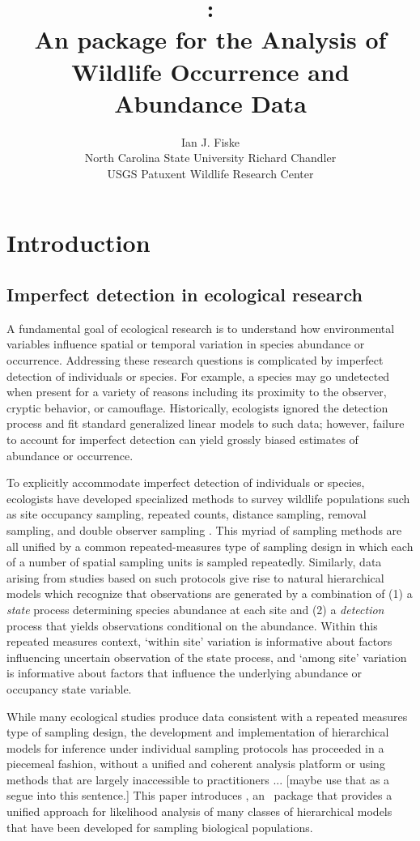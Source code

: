 \documentclass[article,shortnames]{jss}
\author{Ian J. Fiske\\North Carolina State University \And
  Richard Chandler\\ USGS Patuxent Wildlife Research Center}
\title{\pkg{unmarked}:\\
  An \proglang{R} package for the Analysis of Wildlife Occurrence and Abundance Data}
\newcommand{\um}{\pkg{unmarked}}
\newcommand{\rlang}{\proglang{R}}
\begin{document}
\section{Introduction}


\subsection{Imperfect detection in ecological research}

A fundamental goal of ecological research is to understand how environmental 
variables influence spatial or temporal variation in species abundance or 
occurrence.  Addressing these research questions is complicated by imperfect 
detection of individuals or species.  For example, a species may go 
undetected when present for a variety of reasons including its proximity to 
the observer, cryptic behavior, or camouflage.  Historically, 
ecologists ignored the detection process and fit standard generalized linear 
models to such data; however, failure to account for imperfect detection can 
yield grossly biased estimates of abundance or occurrence.  

To explicitly accommodate imperfect detection of individuals or species, 
ecologists have developed specialized methods to survey wildlife 
populations such as site occupancy sampling, repeated counts, 
distance sampling, removal sampling, and double observer sampling 
\citetext{see Section~\ref{sec:models-impl-unmark} and 
\citep{WilliamsEA2002} for definitions}.  This myriad of sampling methods 
are all unified by a common repeated-measures type of sampling design in 
which each of a number of spatial sampling units is sampled repeatedly.  
Similarly, data arising from studies based on such protocols give rise 
to natural hierarchical models which recognize that observations are 
generated by a combination of (1) a \emph{state} process 
determining species abundance at each site and (2) a \emph{detection} 
process that yields observations conditional on the abundance.  
Within this repeated measures context, `within site' variation is 
informative about factors influencing uncertain observation of the state 
process, and `among site' variation is informative about factors that 
influence the underlying abundance or occupancy state variable.  

While many ecological studies produce data consistent with a repeated 
measures type of sampling design, the development and implementation of 
hierarchical models for inference under individual sampling protocols has 
proceeded in a piecemeal fashion, without a unified and coherent analysis 
platform or using methods that are largely inaccessible to practitioners ... 
[maybe use that as a segue into this sentence.]
This paper introduces \um, an \rlang\ package that provides a 
unified approach for likelihood analysis of many classes of hierarchical 
models that have been developed for sampling biological populations.
\end{document}
